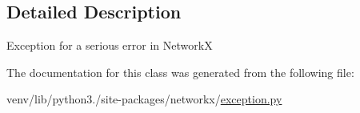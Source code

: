 \subsection{Detailed Description}
\begin{DoxyVerb}Exception for a serious error in NetworkX\end{DoxyVerb}
 

The documentation for this class was generated from the following file\+:\begin{DoxyCompactItemize}
\item 
venv/lib/python3./site-\/packages/networkx/\hyperlink{exception_8py}{exception.\+py}\end{DoxyCompactItemize}
